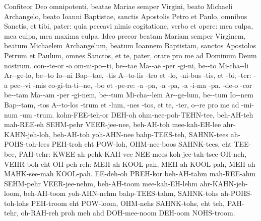  {Confiteor Deo omnipotenti, beatae Mariae semper Virgini, beato Michaeli Archangelo, beato Ioanni Baptistae, sanctis Apostolis Petro et Paulo, omnibus Sanctis, et tibi, pater: quia peccavi nimis cogitatione, verbo et opere: mea culpa, mea culpa, mea maxima culpa. Ideo precor beatam Mariam semper Virginem, beatum Michaelem Archangelum, beatum Ioannem Baptistam, sanctos Apostolos Petrum et Paulum, omnes Sanctos, et te, pater, orare pro me ad Dominum Deum nostrum.}
  {con--te-or -o om-ni-po--ti, be--tae Ma--ae -per -gi-ni, be--to Mi-cha--li Ar--ge-lo, be--to Io--ni Bap--tae, -tis A--to-lis -tro et -lo, -ni-bus -tis, et -bi, -ter: -a pec--vi -mis co-gi-ta-ti--ne, -bo et -pe-re: -a -pa, -a -pa, -a -i-ma -pa. -de-o -cor be--tam Ma--am -per -gi-nem, be--tum Mi-cha--lem Ar--ge-lum, be--tum Io--nem Bap--tam, -tos A--to-los -trum et -lum, -nes -tos, et te, -ter, o--re pro me ad -mi-num -um -trum.}
  {kohn-FEE-teh-or DEH-oh ohm-nee-poh-TEHN-tee, beh-AH-teh mah-REE-eh SEHM-pehr VEER-jee-nee, beh-AH-toh mee-kah-EH-lee ahr-KAHN-jeh-loh, beh-AH-toh yoh-AHN-nee bahp-TEES-teh, SAHNK-tees ah-POHS-toh-lees PEH-troh eht POW-loh, OHM-nee-boos SAHNK-tees, eht TEE-bee, PAH-tehr: KWEE-ah pehk-KAH-vee NEE-mees koh-jee-tah-tsee-OH-neh, VEHR-boh eht OH-peh-reh: MEH-ah KOOL-pah, MEH-ah KOOL-pah, MEH-ah MAHK-see-mah KOOL-pah. EE-deh-oh PREH-kor beh-AH-tahm mah-REE-ahm SEHM-pehr VEER-jee-nehm, beh-AH-toom mee-kah-EH-lehm ahr-KAHN-jeh-loom, beh-AH-toom yoh-AHN-nehm bahp-TEES-tahm, SAHNK-tohs ah-POHS-toh-lohs PEH-troom eht POW-loom, OHM-nehs SAHNK-tohs, eht teh, PAH-tehr, oh-RAH-reh proh meh ahd DOH-mee-noom DEH-oom NOHS-troom.}
